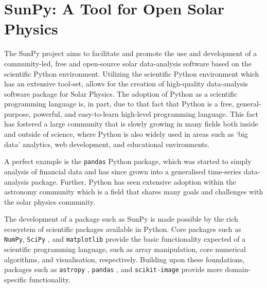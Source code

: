 
\chapter{SunPy: A Tool for Open Solar Physics}\label{ch:sunpy}

The SunPy project \citep{thesunpycommunity2015a} aims to facilitate and promote the use and development of a community-led, free and open-source solar data-analysis software based on the scientific Python environment.
Utilizing the scientific Python environment which has an extensive tool-set, allows for the creation of high-quality data-analysis software package for Solar Physics.
The adoption of Python as a scientific programming language is, in part, due to that fact that Python is a free, general-purpose, powerful, and easy-to-learn high-level programming language.
This fact has fostered a large community that is slowly growing in many fields both inside and outside of science, where Python is also widely used in areas such as `big data' analytics, web development, and educational environments.

A perfect example is the \texttt{pandas} \citep{mckinney2010, mckinney2012} Python package, which was started to simply analysis of financial data and has since grown into a generalised time-series data-analysis package.
Further, Python has seen extensive adoption within the astronomy community \citep{greenfield2011} which is a field that shares many goals and challenges with the solar physics community.

The development of a package such as SunPy is made possible by the rich ecosystem of scientific packages available in Python.
Core packages such as \texttt{NumPy}, 
\texttt{SciPy} \citep{jones2001}, and \texttt{matplotlib} \citep{hunter2007} provide the basic functionality expected of a scientific programming language, such as array manipulation, core numerical algorithms, and visualisation, respectively.
Building upon these foundations, packages such as \texttt{astropy} \citep[astronomy;][]{theastropycollaboration2013}, \texttt{pandas} \citep[time-series;][]{mckinney2012}, and \texttt{scikit-image} \citep[image processing;][]{vanderwalt2014} provide more domain-specific functionality.

